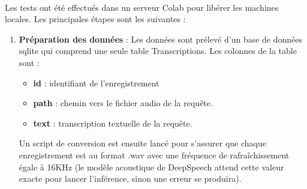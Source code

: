 	\paragraph{}
	Les tests ont été effectués dans un serveur Colab pour libérer les machines locales. Les principales étapes sont les suivantes :  
	\begin{enumerate}
		\item \textbf{Préparation des données} : Les données sont prélevé d'un base de données sqlite qui comprend une seule table Transcriptions. Les colonnes de la table sont : 
		\begin{itemize}
			\item \textbf{id} : identifiant de l'enregistrement
			\item \textbf{path} : chemin vers le fichier audio de la requête.
			\item \textbf{text} : transcription textuelle de la requête.
		\end{itemize}
		\par
		Un script de conversion est ensuite lancé pour s'assurer que chaque enregistrement est au format .wav avec une fréquence de rafraîchissement égale à 16KHz (le modèle acoustique de DeepSpeech attend cette valeur exacte pour lancer l'inférence, sinon une erreur se produira).
		

\end{enumerate}
